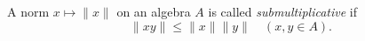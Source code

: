 A norm $x \mapsto \|x\|$ on an algebra $A$ is called \emph{submultiplicative} if
$$\|x y\| \leq \|x\| \|y\| \quad (x, y \in A).$$
